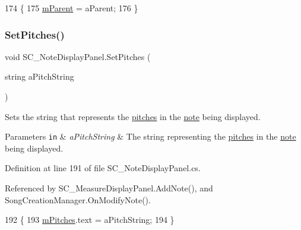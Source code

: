 \begin{DoxyCode}
174     \{
175         \hyperlink{group___s_c___n_d_p_priv_var_ga360017747d9ed8910ddd4b3309477710}{mParent} = aParent;
176     \}
\end{DoxyCode}
\mbox{\label{group___s_c___n_d_p_unity_gad9bf776f0c51cf6170faccf9fc4ac7e0}} 
\subsubsection{\texorpdfstring{Set\+Pitches()}{SetPitches()}}
{\footnotesize\ttfamily void S\+C\+\_\+\+Note\+Display\+Panel.\+Set\+Pitches (\begin{DoxyParamCaption}\item[{string}]{a\+Pitch\+String }\end{DoxyParamCaption})}



Sets the string that represents the \hyperlink{group___music_enums_ga508f69b199ea518f935486c990edac1d}{pitches} in the \hyperlink{group___music_structs_struct_music_1_1_combined_note}{note} being displayed. 


\begin{DoxyParams}[1]{Parameters}
\mbox{\tt in}  & {\em a\+Pitch\+String} & The string representing the \hyperlink{group___music_enums_ga508f69b199ea518f935486c990edac1d}{pitches} in the \hyperlink{group___music_structs_struct_music_1_1_combined_note}{note} being displayed. \\
\hline
\end{DoxyParams}


Definition at line 191 of file S\+C\+\_\+\+Note\+Display\+Panel.\+cs.



Referenced by S\+C\+\_\+\+Measure\+Display\+Panel.\+Add\+Note(), and Song\+Creation\+Manager.\+On\+Modify\+Note().


\begin{DoxyCode}
192     \{
193         \hyperlink{group___s_c___n_d_p_priv_var_ga8018aa4f7b333a7129badf082f233a3c}{mPitches}.text = aPitchString;
194     \}
\end{DoxyCode}
\mbox{\label{group___s_c___n_d_p_unity_ga8a2fef715606caa884c7b490850fb9b7}} 
